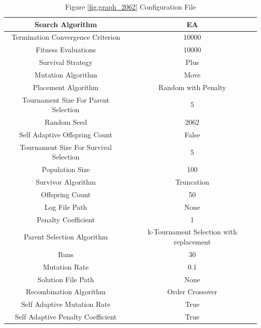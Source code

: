 \documentclass{standalone}
\begin{document}
\begin{table}[!htb]
	\centering
	\caption{Figure \ref{fig:graph_2062} Configuration File}
	\label{tab:graph_2062}
	\begin{tabular}{| c | c |}
		\hline
		Search Algorithm		& EA		 \\
		\hline
		Termination Convergence Criterion		& 10000		 \\
		\hline
		Fitness Evaluations		& 10000		 \\
		\hline
		Survival Strategy		& Plus		 \\
		\hline
		Mutation Algorithm		& Move		 \\
		\hline
		Placement Algorithm		& Random with Penalty		 \\
		\hline
		Tournament Size For Parent Selection		& 5		 \\
		\hline
		Random Seed		& 2062		 \\
		\hline
		Self Adaptive Offspring Count		& False		 \\
		\hline
		Tournament Size For Survival Selection		& 5		 \\
		\hline
		Population Size		& 100		 \\
		\hline
		Survivor Algorithm		& Truncation		 \\
		\hline
		Offspring Count		& 50		 \\
		\hline
		Log File Path		& None		 \\
		\hline
		Penalty Coefficient		& 1		 \\
		\hline
		Parent Selection Algorithm		& k-Tournament Selection with replacement		 \\
		\hline
		Runs		& 30		 \\
		\hline
		Mutation Rate		& 0.1		 \\
		\hline
		Solution File Path		& None		 \\
		\hline
		Recombination Algorithm		& Order Crossover		 \\
		\hline
		Self Adaptive Mutation Rate		& True		 \\
		\hline
		Self Adaptive Penalty Coefficient		& True		 \\
		\hline
	\end{tabular}
\end{table}
\end{document}
